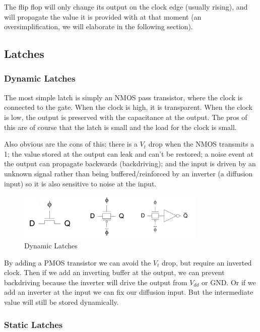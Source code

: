 \documentclass{article}
\begin{document}
The flip flop will only change its output on the clock edge (usually rising), and will propagate the value it is provided with at that moment (an oversimplification, we will elaborate in the following section). 

\subsection{Latches}

\subsubsection{Dynamic Latches}

The most simple latch is simply an NMOS pass transistor, where the clock is connected to the gate. When the clock is high, it is transparent. When the clock is low, the output is preserved with the capacitance at the output. The pros of this are of course that the latch is small and the load for the clock  is small. 

Also obvious are the cons of this: there is a $V_t$ drop when the NMOS transmits a 1; the value stored at the output can leak and can't be restored; a noise event at the output can propagate backwards (backdriving); and the input is driven by an unknown signal rather than being buffered/reinforced by an inverter (a diffusion input) so it is also sensitive to noise at the input.

\begin{figure}[ht!]
\centering
\includegraphics[width=90mm]{StaticLatch.png}
\caption{Dynamic Latches}
\end{figure}

By adding a PMOS transistor we can avoid the $V_t$ drop, but require an inverted clock. Then if we add an inverting buffer at the output, we can prevent backdriving because the inverter will drive the output from $V_{dd}$ or GND. Or if we add an inverter at the input we can fix our diffusion input. But the intermediate value will still be stored dynamically.  



\subsubsection{Static Latches}
\end{document}
